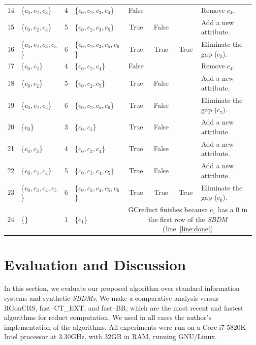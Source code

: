 \documentclass[authoryear,preprint,review,12pt]{elsarticle}
\begin{document}
\begin{table}[!htb]
\begin{tabular}{|c|l|c|l|c|c|c|l|}
    		14 & \{$c_0,c_2,c_3$\} 		& 4 & \{$c_0,c_2,c_3,c_4$\}		& False &   &   & Remove $c_4$.\\
    		15 & \{$c_0,c_2,c_3$\}		& 5 & \{$c_0,c_2,c_3,c_5$\}		& True & False &   & Add a new attribute.\\
    		16 & \{$c_0,c_2,c_3,c_5$\}	& 6 & \{$c_0,c_2,c_3,c_5,c_6$\} 	& True & True & True & Eliminate the gap ($c_3$).\\
    		17 & \{$c_0,c_2$\} 			& 4 & \{$c_0,c_2,c_4$\}			& False &   &   & Remove $c_4$.\\
    		18 & \{$c_0,c_2$\}			& 5 & \{$c_0,c_2,c_5$\}			& True & False &   & Add a new attribute.\\
    		19 & \{$c_0,c_2,c_5$\}		& 6 & \{$c_0,c_2,c_5,c_6$\}		& True & False &   & Eliminate the gap ($c_2$).\\
    		20 & \{$c_0$\} 				& 3 & \{$c_0,c_3$\}				& True & False &   & Add a new attribute.\\    		
    		21 & \{$c_0,c_3$\}			& 4 & \{$c_0,c_3,c_4$\}			& True & False &   & Add a new attribute.\\
    		22 & \{$c_0,c_3,c_4$\}		& 5 & \{$c_0,c_3,c_4,c_5$\}		& True & False &   & Add a new attribute.\\
    		23 & \{$c_0,c_3,c_4,c_5$\}	& 6 & \{$c_0,c_3,c_4,c_5,c_6$\} 	& True & True & True & Eliminate the gap ($c_0$).\\
    		\hline
    		24 & \{\} 					& 1 & \{$c_1$\} 					& 
    		\multicolumn{4}{p{5cm}|}{GCreduct finishes because $c_1$ has a 0 in the first row of the \textit{SBDM} (line~\ref{line:done})}\\
    		\hline
		\end{tabular}
	\end{table}
	
%
\section{Evaluation and Discussion}\label{evaluation}
	In this section, we evaluate our proposed algorithm over standard information systems \citep{Bache13} and synthetic \textit{SBDMs}. We make a comparative analysis versus RGonCRS, fast--CT\_EXT, and fast--BR; which are the most recent and fastest algorithms for reduct computation. We used in all cases the author's implementation of the algorithms. All experiments were run on a Core i7-5820K Intel processor at 3.30GHz, with 32GB in RAM, running GNU/Linux.
	
\end{document}
